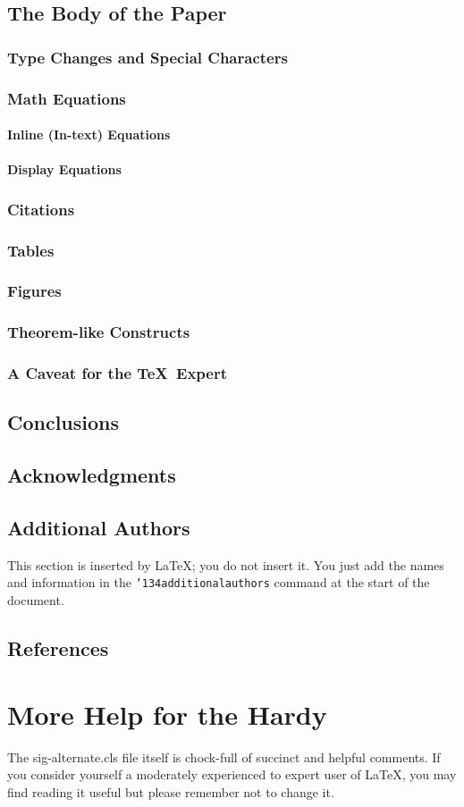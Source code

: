 \documentclass{sig-alternate-05-2015}
\begin{document}
\subsection{The Body of the Paper}
\subsubsection{Type Changes and  Special Characters}
\subsubsection{Math Equations}
\paragraph{Inline (In-text) Equations}
\paragraph{Display Equations}
\subsubsection{Citations}
\subsubsection{Tables}
\subsubsection{Figures}
\subsubsection{Theorem-like Constructs}
\subsubsection*{A Caveat for the \TeX\ Expert}
\subsection{Conclusions}
\subsection{Acknowledgments}
\subsection{Additional Authors}
This section is inserted by \LaTeX; you do not insert it.
You just add the names and information in the
\texttt{{\char'134}additionalauthors} command at the start
of the document.
\subsection{References}
\section{More Help for the Hardy}
The sig-alternate.cls file itself is chock-full of succinct
and helpful comments.  If you consider yourself a moderately
experienced to expert user of \LaTeX, you may find reading
it useful but please remember not to change it.
\end{document}
